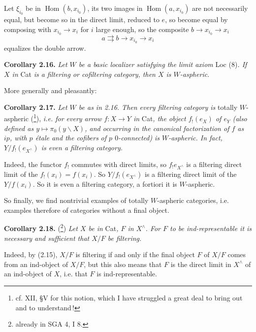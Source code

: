 \documentclass[11pt]{article}
\newcommand{\printedpage}[1]{\marginpar{\footnotesize p.~#1}}
\newcommand{\msp}[1]{\marginpar{\footnotesize [#1]}}
\newcommand{\Hom}{\operatorname{Hom}}
\begin{document}
\printedpage{21}

\msp{page 34}
Let $\xi_{i_0}$ be in $\Hom(b,x_{i_0})$, its two images in $\Hom(a,x_{i_0})$ are not necessarily equal, but become so in the direct limit, reduced to $e$, so become equal by composing with $x_{i_0} \longrightarrow x_i$ for $i$ large enough, so the composite $b \longrightarrow x_{i_0} \longrightarrow x_i$
\[
a \rightrightarrows b \longrightarrow x_{i_0} \longrightarrow x_i
\]
equalizes the double arrow.

\noindent\textbf{Corollary 2.16.} \textit{Let $W$ be a basic localizer satisfying the limit axiom} Loc (8)\textit{. If $X$ in} Cat \textit{is a filtering or cofiltering category, then $X$ is $W$-aspheric.}

More generally and pleasantly:

\noindent\textbf{Corollary 2.17.} \textit{Let $W$ be as in 2.16. Then every filtering category is} totally $W$-aspheric (\footnote[40]{cf. XII, §V for this notion, which I have struggled a great deal to bring out and to understand\,!}), \textit{i.e. for every arrow $f : X \longrightarrow Y$ in} Cat\textit{, the object $f_!(e_X)$ of $e_Y$ (also defined as $y \longmapsto \pi_0(y\backslash X)$, and occurring in the canonical factorization of $f$ as $ip$, with $p$ étale and the cofibers} \textit{of $p$ $0$-connected)} \msp{page 35} \textit{is $W$-aspheric. In fact, $Y/f_!(e_{X^\wedge})$ is even a filtering category.}

Indeed, the functor $f_!$ commutes with direct limits, so $f_! e_{X^\wedge}$ is a filtering direct limit of the $f_!(x_i) = f(x_i)$. So $Y/f_!(e_{X^\wedge})$ is a filtering direct limit of the $Y/f(x_i)$. So it is even a filtering category, a fortiori it is $W$-aspheric.

So finally, we find nontrivial examples of totally $W$-aspheric categories, i.e. examples therefore of categories without a final object. %

\noindent\textbf{Corollary 2.18.} (\footnote[41]{already in SGA 4, I 8.}) \textit{Let $X$ be in} Cat\textit{, $F$ in $X^\wedge$. For $F$ to be ind-representable it is necessary and sufficient that $X/F$ be filtering.}

Indeed, by (2.15), $X/F$ is filtering if and only if the final object $F$ of $X/F$ comes from an ind-object of $X/F$, but this also means that $F$ is the direct limit in $X^\wedge$ of an ind-object of $X$, i.e. that $F$ is ind-representable.
\end{document}

